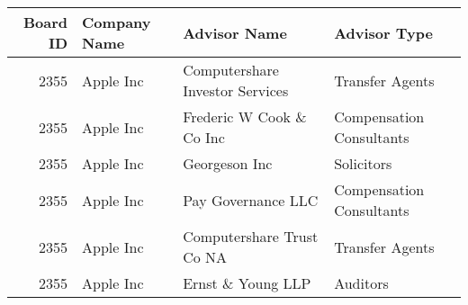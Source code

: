 

\begin{longtable}{ r l l l }\hline\hline               
   Board ID &    Company Name &    Advisor Name &    Advisor Type\\ 
               \hline\endhead
   2355 &    Apple Inc &    Computershare Investor Services &    Transfer Agents\\ 
   2355 &    Apple Inc &    Frederic W Cook \& Co Inc &    Compensation Consultants\\ 
   2355 &    Apple Inc &    Georgeson Inc &    Solicitors\\ 
   2355 &    Apple Inc &    Pay Governance LLC &    Compensation Consultants\\ 
   2355 &    Apple Inc &    Computershare Trust Co NA &    Transfer Agents\\ 
   2355 &    Apple Inc &    Ernst \& Young LLP &    Auditors\\ 
                              \hline\hline\end{longtable}

